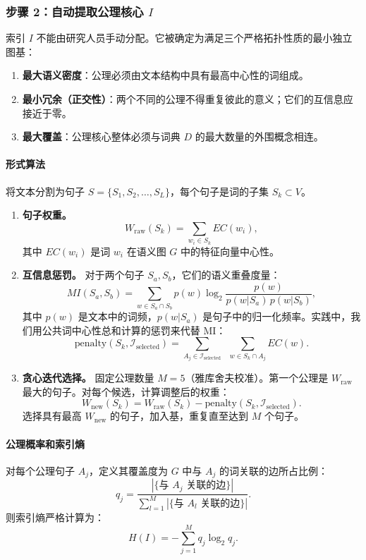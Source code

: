\documentclass[11pt,a4paper]{article}
\begin{document}
	\subsubsection{步骤 2：自动提取公理核心 \(I\)}
	\label{sec:auto-basis}
	
	索引 \(I\) 不能由研究人员手动分配。它被确定为满足三个严格拓扑性质的最小独立图基：
	\begin{enumerate}
		\item \textbf{最大语义密度}：公理必须由文本结构中具有最高中心性的词组成。
		\item \textbf{最小冗余（正交性）}：两个不同的公理不得重复彼此的意义；它们的互信息应接近于零。
		\item \textbf{最大覆盖}：公理核心整体必须与词典 \(D\) 的最大数量的外围概念相连。
	\end{enumerate}
	
	\paragraph{形式算法}
	将文本分割为句子 \(S = \{S_1, S_2, \dots, S_L\}\)，每个句子是词的子集 \(S_k \subset V\)。
	
	\begin{enumerate}
		\item \textbf{句子权重。}
		\[
		W_{\text{raw}}(S_k) = \sum_{w_i \in S_k} EC(w_i),
		\]
		其中 \(EC(w_i)\) 是词 \(w_i\) 在语义图 \(G\) 中的特征向量中心性。
		
		\item \textbf{互信息惩罚。}
		对于两个句子 \(S_a, S_b\)，它们的语义重叠度量：
		\[
		MI(S_a, S_b) = \sum_{w \in S_a \cap S_b} p(w) \log_2 \frac{p(w)}{p(w|S_a)\, p(w|S_b)},
		\]
		其中 \(p(w)\) 是文本中的词频，\(p(w|S_a)\) 是句子中的归一化频率。实践中，我们用公共词中心性总和计算的惩罚来代替 MI：
		\[
		\text{penalty}(S_k, \mathcal{I}_{\text{selected}}) = \sum_{A_j \in \mathcal{I}_{\text{selected}}} \;\; \sum_{w \in S_k \cap A_j} EC(w).
		\]
		
		\item \textbf{贪心迭代选择。}
		固定公理数量 \(M = 5\)（雅库舍夫校准）。第一个公理是 \(W_{\text{raw}}\) 最大的句子。对每个候选，计算调整后的权重：
		\[
		W_{\text{new}}(S_k) = W_{\text{raw}}(S_k) - \text{penalty}(S_k, \mathcal{I}_{\text{selected}}).
		\]
		选择具有最高 \(W_{\text{new}}\) 的句子，加入基，重复直至达到 \(M\) 个句子。
	\end{enumerate}
	
	\paragraph{公理概率和索引熵}
	对每个公理句子 \(A_j\)，定义其覆盖度为 \(G\) 中与 \(A_j\) 的词关联的边所占比例：
	\[
	q_j = \frac{|\{\text{与 } A_j \text{ 关联的边}\}|}{\sum_{l=1}^M |\{\text{与 } A_l \text{ 关联的边}\}|}.
	\]
	则索引熵严格计算为：
	\[
	H(I) = -\sum_{j=1}^{M} q_j \log_2 q_j.
	\]
	
\end{document}
